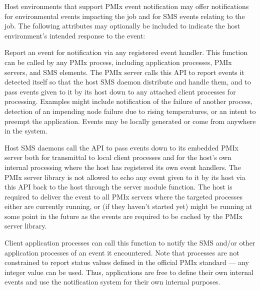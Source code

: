 \optattrstart
Host environments that support \ac{PMIx} event notification may offer notifications for environmental events impacting the job and for \ac{SMS} events relating to the job. The following attributes may optionally be included to indicate the host environment's intended response to the event:


\optattrend

\descr

Report an event for notification via any registered event handler. This function can be called by any \ac{PMIx} process, including application processes, \ac{PMIx} servers, and \ac{SMS} elements. The \ac{PMIx} server calls this \ac{API} to report events it detected itself so that the host \ac{SMS} daemon distribute and handle them, and to pass events given to it by its host down to any attached client processes for processing. Examples might include notification of the failure of another process, detection of an impending node failure due to rising temperatures, or an intent to preempt the application. Events may be locally generated or come from anywhere in the system.

Host \ac{SMS} daemons call the \ac{API} to pass events down to its embedded \ac{PMIx} server both for transmittal to local client processes and for the host's own internal processing where the host has registered its own event handlers. The \ac{PMIx} server library is not allowed to echo any event given to it by its host via this \ac{API} back to the host through the  server module function. The host is required to deliver the event to all \ac{PMIx} servers where the targeted processes either are currently running, or (if they haven't started yet) might be running at some point in the future as the events are required to be cached by the \ac{PMIx} server library.

Client application processes can call this function to notify the \ac{SMS} and/or other application processes of an event it encountered. Note that processes are not constrained to report status values defined in the official \ac{PMIx} standard --- any integer value can be used. Thus, applications are free to define their own internal events and use the notification system for their own internal purposes.

